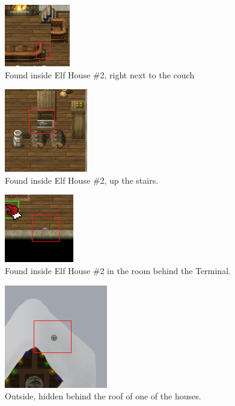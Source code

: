 \documentclass[writeup.tex]{subfiles}
\begin{document}
			\begin{figure}[H]
				\centering
				\includegraphics[scale=1]{"screenshots/coins/Netcoin - Elf House 2 - Right of couch"}
				\caption{Found inside Elf House \#2, right next to the couch}
			\end{figure}
			
			\begin{figure}[H]
				\centering
				\includegraphics[scale=1]{"screenshots/coins/Netcoin - Elf House 2 - Upstairs"}
				\caption{Found inside Elf House \#2, up the stairs.}
			\end{figure}
			
			\begin{figure}[H]
				\centering
				\includegraphics[scale=1]{"screenshots/coins/Netcoin - Elf House 2 - Room 2"}
				\caption{Found inside Elf House \#2 in the room behind the Terminal.}
			\end{figure}
			
			\begin{figure}[H]
				\centering
				\includegraphics[scale=1]{"screenshots/coins/Netcoin - Behind the roof, right side house"}
				\caption{Outside, hidden behind the roof of one of the houses.}
			\end{figure}
			
\end{document}

